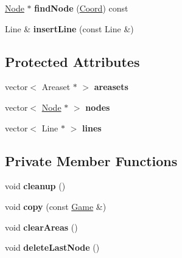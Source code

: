 \begin{DoxyCompactItemize}
\item 
\hypertarget{classGame_a25d65e35ad5efbd14c4dbe4476bb5ec0}{\hyperlink{classNode}{Node} $\ast$ {\bfseries find\+Node} (\hyperlink{structCoord}{Coord}) const }\label{classGame_a25d65e35ad5efbd14c4dbe4476bb5ec0}

\item 
\hypertarget{classGame_a8698d31d2f9314753f392dbd9bb13b3c}{Line \& {\bfseries insert\+Line} (const Line \&)}\label{classGame_a8698d31d2f9314753f392dbd9bb13b3c}

\end{DoxyCompactItemize}
\subsection*{Protected Attributes}
\begin{DoxyCompactItemize}
\item 
\hypertarget{classGame_a1ab0295c1555fa04614de7644d9999c3}{vector$<$ Areaset $\ast$ $>$ {\bfseries areasets}}\label{classGame_a1ab0295c1555fa04614de7644d9999c3}

\item 
\hypertarget{classGame_a21787871b15141dcf1cafeacbd68bc8c}{vector$<$ \hyperlink{classNode}{Node} $\ast$ $>$ {\bfseries nodes}}\label{classGame_a21787871b15141dcf1cafeacbd68bc8c}

\item 
\hypertarget{classGame_acef1deb6e1ef97d367afaeb04af5226c}{vector$<$ Line $\ast$ $>$ {\bfseries lines}}\label{classGame_acef1deb6e1ef97d367afaeb04af5226c}

\end{DoxyCompactItemize}
\subsection*{Private Member Functions}
\begin{DoxyCompactItemize}
\item 
\hypertarget{classGame_a961f632fbe7f4ba08d23fe9edc7711be}{void {\bfseries cleanup} ()}\label{classGame_a961f632fbe7f4ba08d23fe9edc7711be}

\item 
\hypertarget{classGame_a6334d9f0e04044e0fb711f32fe4cfac4}{void {\bfseries copy} (const \hyperlink{classGame}{Game} \&)}\label{classGame_a6334d9f0e04044e0fb711f32fe4cfac4}

\item 
\hypertarget{classGame_a18db1f732aa95c4c6d78440b6d4d109b}{void {\bfseries clear\+Areas} ()}\label{classGame_a18db1f732aa95c4c6d78440b6d4d109b}

\item 
\hypertarget{classGame_a53b0e200e4727eb76ba1bbbd44164c76}{void {\bfseries delete\+Last\+Node} ()}\label{classGame_a53b0e200e4727eb76ba1bbbd44164c76}

\end{DoxyCompactItemize}
